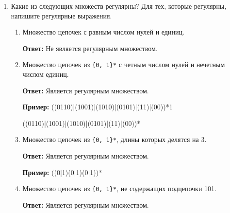 \documentclass[a4paper]{bmstu}
\begin{document}
\begin{enumerate}
    \item Какие из следующих множеств регулярны? Для тех, которые регулярны, напишите регулярные выражения.
    \begin{enumerate}
        \item Множество цепочек с равным числом нулей и единиц.
        
        \textbf{Ответ:} Не является регулярным множеством.

        \item Множество цепочек из \texttt{\{0, 1\}*} с четным числом нулей и нечетным числом единиц.
        
        \textbf{Ответ:} Является регулярным множеством. 

        \textbf{Пример:} ((0110)|(1001)|(1010)|(0101)|(11)|(00))*1
        
        ((0110)|(1001)|(1010)|(0101)|(11)|(00))*

        \item Множество цепочек из \texttt{\{0, 1\}*}, длины которых делятся на 3.
        
        \textbf{Ответ:} Является регулярным множеством. 

        \textbf{Пример:} ((0|1)(0|1)(0|1))*

        \item Множество цепочек из \texttt{\{0, 1\}*}, не содержащих подцепочки 101.
        
        \textbf{Ответ:} Является регулярным множеством. 


\end{enumerate}
\end{enumerate}
\end{document}
